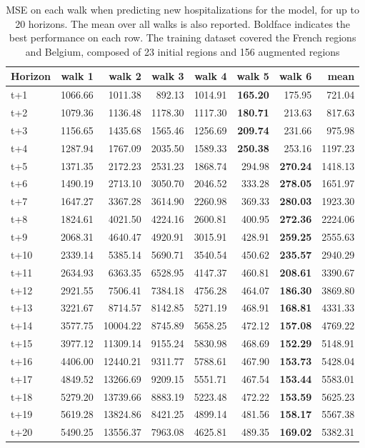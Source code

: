 \begin{table}[H]
\centering
\caption{MSE on each walk when predicting new hospitalizations for the model, for up to 20 horizons. The mean over all walks is also reported. Boldface indicates the best performance on each row. The training dataset covered the French regions and Belgium, composed of 23 initial regions and 156 augmented regions }
\label{tab:MSE_walk_encoder_decoder}
\begin{tabular}{lrrrrrrr}
\toprule
Horizon &  walk 1 &   walk 2 &  walk 3 &  walk 4 &  walk 5 &  walk 6 &    mean \\
\midrule
t+1  & 1066.66  & 1011.38  & 892.13  & 1014.91  & \textbf{165.20}  & 175.95  & 721.04  \\
t+2  & 1079.36  & 1136.48  & 1178.30  & 1117.30  & \textbf{180.71}  & 213.63  & 817.63  \\
t+3  & 1156.65  & 1435.68  & 1565.46  & 1256.69  & \textbf{209.74}  & 231.66  & 975.98  \\
t+4  & 1287.94  & 1767.09  & 2035.50  & 1589.33  & \textbf{250.38}  & 253.16  & 1197.23  \\
t+5  & 1371.35  & 2172.23  & 2531.23  & 1868.74  & 294.98  & \textbf{270.24}  & 1418.13  \\
t+6  & 1490.19  & 2713.10  & 3050.70  & 2046.52  & 333.28  & \textbf{278.05}  & 1651.97  \\
t+7  & 1647.27  & 3367.28  & 3614.90  & 2260.98  & 369.33  & \textbf{280.03}  & 1923.30  \\
t+8  & 1824.61  & 4021.50  & 4224.16  & 2600.81  & 400.95  & \textbf{272.36}  & 2224.06  \\
t+9  & 2068.31  & 4640.47  & 4920.91  & 3015.91  & 428.91  & \textbf{259.25}  & 2555.63  \\
t+10  & 2339.14  & 5385.14  & 5690.71  & 3540.54  & 450.62  & \textbf{235.57}  & 2940.29  \\
t+11  & 2634.93  & 6363.35  & 6528.95  & 4147.37  & 460.81  & \textbf{208.61}  & 3390.67  \\
t+12  & 2921.55  & 7506.41  & 7384.18  & 4756.28  & 464.07  & \textbf{186.30}  & 3869.80  \\
t+13  & 3221.67  & 8714.57  & 8142.85  & 5271.19  & 468.91  & \textbf{168.81}  & 4331.33  \\
t+14  & 3577.75  & 10004.22  & 8745.89  & 5658.25  & 472.12  & \textbf{157.08}  & 4769.22  \\
t+15  & 3977.12  & 11309.14  & 9155.24  & 5830.98  & 468.69  & \textbf{152.29}  & 5148.91  \\
t+16  & 4406.00  & 12440.21  & 9311.77  & 5788.61  & 467.90  & \textbf{153.73}  & 5428.04  \\
t+17  & 4849.52  & 13266.69  & 9209.15  & 5551.71  & 467.54  & \textbf{153.44}  & 5583.01  \\
t+18  & 5279.20  & 13739.66  & 8883.19  & 5223.48  & 472.22  & \textbf{153.59}  & 5625.23  \\
t+19  & 5619.28  & 13824.86  & 8421.25  & 4899.14  & 481.56  & \textbf{158.17}  & 5567.38  \\
t+20  & 5490.25  & 13556.37  & 7963.08  & 4625.81  & 489.35  & \textbf{169.02}  & 5382.31  \\


\end{tabular}
\end{table}
